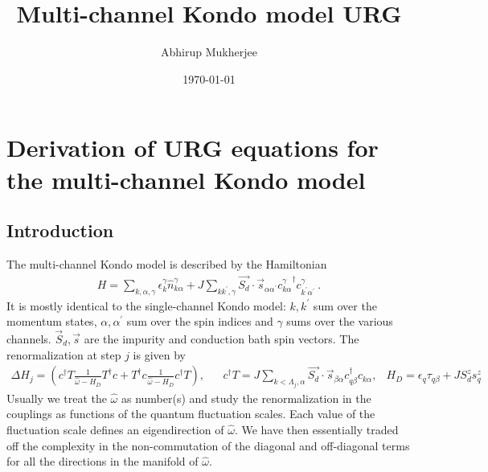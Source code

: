 \documentclass{revtex4-2}
\numberwithin{equation}{section}
\begin{document}
\title{Multi-channel Kondo model URG}
\author{Abhirup Mukherjee}
\date{\today}
\maketitle
\section{Derivation of URG equations for the multi-channel Kondo model}

\subsection{Introduction}
The multi-channel Kondo model is described by the Hamiltonian
\begin{equation}\begin{aligned}
	H = \sum_{k,\alpha,\gamma}\epsilon_{k}^\gamma \hat n^\gamma_{k\alpha} + J\sum_{kk^\prime,\gamma} \vec{S_d}\cdot\vec{s}_{\alpha\alpha^\prime}{c^\gamma_{k\alpha}}^\dagger c^\gamma_{k^\prime\alpha^\prime}~.
\end{aligned}\end{equation}
It is mostly identical to the single-channel Kondo model: \(k,k^\prime\) sum over the momentum states, \(\alpha,\alpha^\prime\) sum over the spin indices and \(\gamma\) sums over the various channels. \(\vec S_d, \vec s\) are the impurity and conduction bath spin vectors. The renormalization at step \(j\) is given by
\begin{equation}\begin{aligned}
	\Delta H_j = \left(c^\dagger T \frac{1}{\hat \omega - H_D}T^\dagger c + T^\dagger c \frac{1}{\hat \omega - H_D}c^\dagger T\right), && c^\dagger T = J \sum_{k < \Lambda_j, \alpha}\vec{S_d}\cdot\vec{s}_{\beta \alpha}c^\dagger_{q\beta}c_{k\alpha}, &H_D = \epsilon_q \tau_{q\beta} + J S_d^z s_q^z
\end{aligned}\end{equation}
Usually we treat the \(\hat \omega\) as number(s) and study the renormalization in the couplings as functions of the quantum fluctuation scales. Each value of the fluctuation scale defines an eigendirection of \(\hat \omega\). We have then essentially traded off the complexity in the non-commutation of the diagonal and off-diagonal terms for all the directions in the manifold of \(\hat \omega\).
\end{document}
